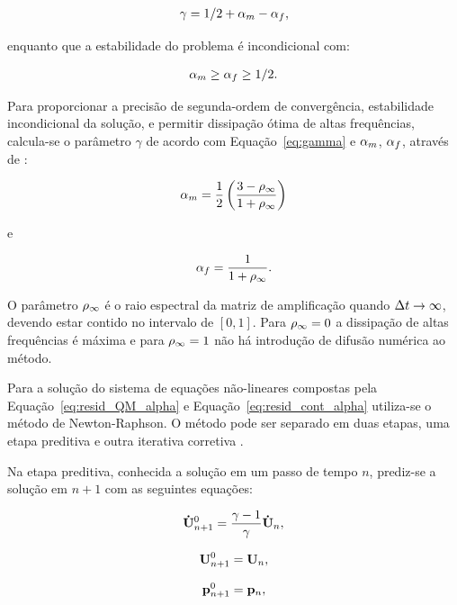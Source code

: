 \begin{gather}
\gamma = 1/2 + \alpha_m - \alpha_f,\label{eq:gamma}
\end{gather}

\noindent enquanto que a estabilidade do problema é incondicional com:

\begin{gather}
\alpha_m \ge \alpha_f \ge 1/2.
\end{gather}

Para proporcionar a precisão de segunda-ordem de convergência, estabilidade incondicional da solução, e permitir dissipação ótima de altas frequências, calcula-se o parâmetro $\gamma$ de acordo com Equação~\eqref{eq:gamma} e $\alpha_m$, $\alpha_f$, através de \cite{Hughes:2000}:

\begin{gather}
\alpha_m = \frac{1}{2}\left(\frac{3 - \rho_\infty}{1+\rho_\infty}\right)\label{eq:alpha_m}
\end{gather}

\noindent e

\begin{gather}
\alpha_f = \frac{1}{1+\rho_\infty}\label{eq:alpha_f}.
\end{gather}

O parâmetro $\rho_\infty$ é o raio espectral da matriz de amplificação quando $\Delta t \rightarrow \infty$, devendo estar contido no intervalo de $[0,1]$. Para $\rho_\infty = 0$ a dissipação de altas frequências é máxima e para $\rho_\infty = 1$ não há introdução de difusão numérica ao método.

Para a solução do sistema de equações não-lineares compostas pela Equação~\eqref{eq:resid_QM_alpha} e Equação~\eqref{eq:resid_cont_alpha} utiliza-se o método de Newton-Raphson. O método pode ser separado em duas etapas, uma etapa preditiva e outra iterativa corretiva \cite{BazilevsTT:2013a}.

Na etapa preditiva, conhecida a solução em um passo de tempo $n$, prediz-se a solução em $n+1$ com as seguintes equações:

\begin{align}
\mathbf{\dot{U}}_{n+1}^{0} = \frac{\gamma-1}{\gamma}\mathbf{\dot{U}}_{n} \label{eq:pred_acel},
\end{align}

\begin{align}
\mathbf{U}_{n+1}^{0} = \mathbf{U}_{n}, \label{eq:pred_vel}
\end{align}

\begin{align}
\mathbf{p}_{n+1}^{0} = \mathbf{p}_{n},\label{eq:pred_press}
\end{align}

